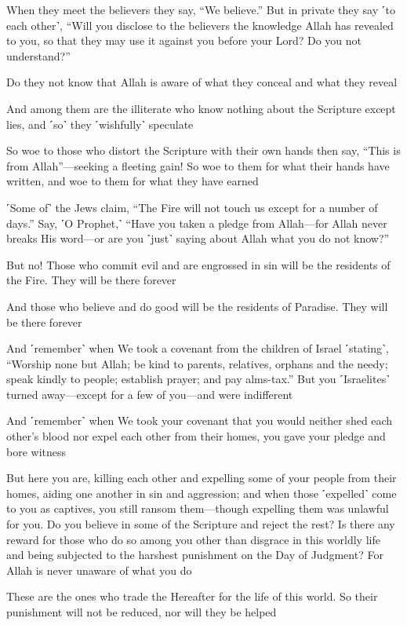 When they meet the believers they say, “We believe.” But in private they say ˹to each other˺, “Will you disclose to the believers the knowledge Allah has revealed to you, so that they may use it against you before your Lord? Do you not understand?”

Do they not know that Allah is aware of what they conceal and what they reveal

And among them are the illiterate who know nothing about the Scripture except lies, and ˹so˺ they ˹wishfully˺ speculate

So woe to those who distort the Scripture with their own hands then say, “This is from Allah”—seeking a fleeting gain! So woe to them for what their hands have written, and woe to them for what they have earned

˹Some of˺ the Jews claim, “The Fire will not touch us except for a number of days.” Say, ˹O Prophet,˺ “Have you taken a pledge from Allah—for Allah never breaks His word—or are you ˹just˺ saying about Allah what you do not know?”

But no! Those who commit evil and are engrossed in sin will be the residents of the Fire. They will be there forever

And those who believe and do good will be the residents of Paradise. They will be there forever

And ˹remember˺ when We took a covenant from the children of Israel ˹stating˺, “Worship none but Allah; be kind to parents, relatives, orphans and the needy; speak kindly to people; establish prayer; and pay alms-tax.” But you ˹Israelites˺ turned away—except for a few of you—and were indifferent

And ˹remember˺ when We took your covenant that you would neither shed each other’s blood nor expel each other from their homes, you gave your pledge and bore witness

But here you are, killing each other and expelling some of your people from their homes, aiding one another in sin and aggression; and when those ˹expelled˺ come to you as captives, you still ransom them—though expelling them was unlawful for you. Do you believe in some of the Scripture and reject the rest? Is there any reward for those who do so among you other than disgrace in this worldly life and being subjected to the harshest punishment on the Day of Judgment? For Allah is never unaware of what you do

These are the ones who trade the Hereafter for the life of this world. So their punishment will not be reduced, nor will they be helped


